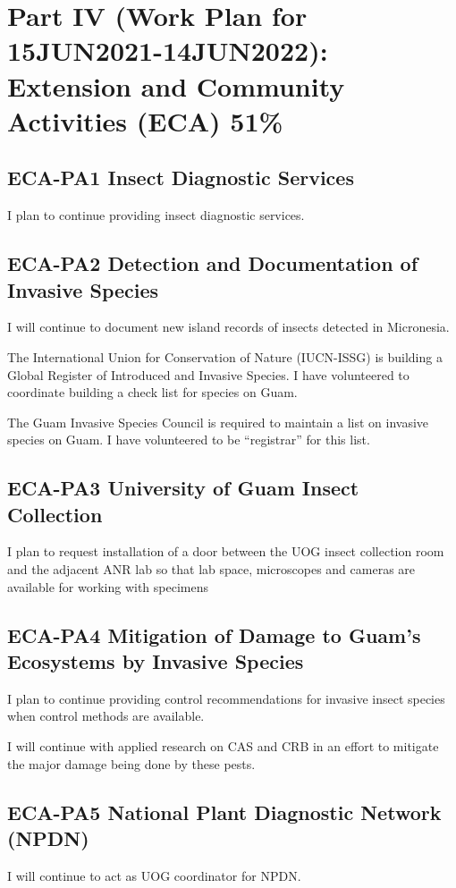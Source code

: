 \section{Part IV (Work Plan for 15JUN2021-14JUN2022): Extension and Community Activities (ECA) 51\%}

\subsection{ECA-PA1 Insect Diagnostic Services} 
I plan to continue providing insect diagnostic services.

\subsection{ECA-PA2 Detection and Documentation of Invasive Species} 
I will continue to document new island records of insects detected in Micronesia.

The International Union for Conservation of Nature (IUCN-ISSG) is
building a Global Register of Introduced and Invasive Species. I have
volunteered to coordinate building a check list for species on Guam.

The Guam Invasive Species Council is required to maintain a list on
invasive species on Guam. I have volunteered to be ``registrar''
for this list.

\subsection{ECA-PA3 University of Guam Insect Collection}
I plan to request installation of a door between the UOG insect collection room and the adjacent ANR lab so that lab space, microscopes and cameras are available for working with specimens 

\subsection{ECA-PA4 Mitigation of Damage to Guam's Ecosystems by Invasive Species} 
I plan to continue providing control recommendations for invasive insect species when control methods are available.

I will continue with applied research on CAS and CRB in an effort to mitigate the major damage being done by these pests.

\subsection{ECA-PA5 National Plant Diagnostic Network (NPDN)}
I will continue to act as UOG coordinator for NPDN.

